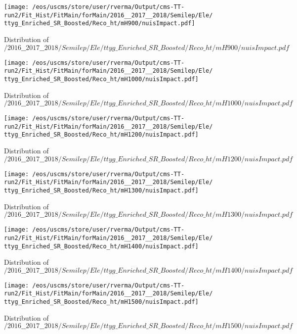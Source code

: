 \begin{figure}
\centering
\texttt{[image: /eos/uscms/store/user/rverma/Output/cms-TT-run2/Fit\_Hist/FitMain/forMain/2016\_\_2017\_\_2018/Semilep/Ele/ttyg\_Enriched\_SR\_Boosted/Reco\_ht/mH900/nuisImpact.pdf]}
\caption{Distribution of $/2016\_\_2017\_\_2018/Semilep/Ele/ttyg\_Enriched\_SR\_Boosted/Reco\_ht/mH900/nuisImpact.pdf$}
\end{figure}

\begin{figure}
\centering
\texttt{[image: /eos/uscms/store/user/rverma/Output/cms-TT-run2/Fit\_Hist/FitMain/forMain/2016\_\_2017\_\_2018/Semilep/Ele/ttyg\_Enriched\_SR\_Boosted/Reco\_ht/mH1000/nuisImpact.pdf]}
\caption{Distribution of $/2016\_\_2017\_\_2018/Semilep/Ele/ttyg\_Enriched\_SR\_Boosted/Reco\_ht/mH1000/nuisImpact.pdf$}
\end{figure}

\begin{figure}
\centering
\texttt{[image: /eos/uscms/store/user/rverma/Output/cms-TT-run2/Fit\_Hist/FitMain/forMain/2016\_\_2017\_\_2018/Semilep/Ele/ttyg\_Enriched\_SR\_Boosted/Reco\_ht/mH1200/nuisImpact.pdf]}
\caption{Distribution of $/2016\_\_2017\_\_2018/Semilep/Ele/ttyg\_Enriched\_SR\_Boosted/Reco\_ht/mH1200/nuisImpact.pdf$}
\end{figure}

\begin{figure}
\centering
\texttt{[image: /eos/uscms/store/user/rverma/Output/cms-TT-run2/Fit\_Hist/FitMain/forMain/2016\_\_2017\_\_2018/Semilep/Ele/ttyg\_Enriched\_SR\_Boosted/Reco\_ht/mH1300/nuisImpact.pdf]}
\caption{Distribution of $/2016\_\_2017\_\_2018/Semilep/Ele/ttyg\_Enriched\_SR\_Boosted/Reco\_ht/mH1300/nuisImpact.pdf$}
\end{figure}

\begin{figure}
\centering
\texttt{[image: /eos/uscms/store/user/rverma/Output/cms-TT-run2/Fit\_Hist/FitMain/forMain/2016\_\_2017\_\_2018/Semilep/Ele/ttyg\_Enriched\_SR\_Boosted/Reco\_ht/mH1400/nuisImpact.pdf]}
\caption{Distribution of $/2016\_\_2017\_\_2018/Semilep/Ele/ttyg\_Enriched\_SR\_Boosted/Reco\_ht/mH1400/nuisImpact.pdf$}
\end{figure}

\begin{figure}
\centering
\texttt{[image: /eos/uscms/store/user/rverma/Output/cms-TT-run2/Fit\_Hist/FitMain/forMain/2016\_\_2017\_\_2018/Semilep/Ele/ttyg\_Enriched\_SR\_Boosted/Reco\_ht/mH1500/nuisImpact.pdf]}
\caption{Distribution of $/2016\_\_2017\_\_2018/Semilep/Ele/ttyg\_Enriched\_SR\_Boosted/Reco\_ht/mH1500/nuisImpact.pdf$}
\end{figure}

